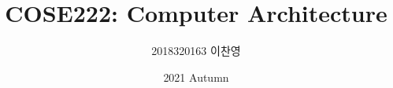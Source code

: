

\title{COSE222: Computer Architecture}
\author{2018320163 이찬영}
\date{2021 Autumn}


    \maketitle
    \tableofcontents
    \setimgdir

